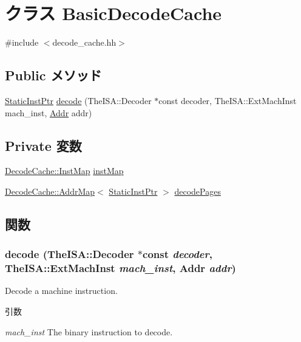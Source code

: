 \hypertarget{classGenericISA_1_1BasicDecodeCache}{
\section{クラス BasicDecodeCache}
\label{classGenericISA_1_1BasicDecodeCache}
}


{\ttfamily \#include $<$decode\_\-cache.hh$>$}\subsection*{Public メソッド}
\begin{DoxyCompactItemize}
\item 
\hyperlink{classRefCountingPtr}{StaticInstPtr} \hyperlink{classGenericISA_1_1BasicDecodeCache_a72ea97ec0370232cc2dfaa755e5ae6f5}{decode} (TheISA::Decoder $\ast$const decoder, TheISA::ExtMachInst mach\_\-inst, \hyperlink{base_2types_8hh_af1bb03d6a4ee096394a6749f0a169232}{Addr} addr)
\end{DoxyCompactItemize}
\subsection*{Private 変数}
\begin{DoxyCompactItemize}
\item 
\hyperlink{namespaceDecodeCache_ac4aa7140c72815d25936c8dcf04191f1}{DecodeCache::InstMap} \hyperlink{classGenericISA_1_1BasicDecodeCache_abd0faa656234a0fd1a69ea9a2d61d154}{instMap}
\item 
\hyperlink{classDecodeCache_1_1AddrMap}{DecodeCache::AddrMap}$<$ \hyperlink{classRefCountingPtr}{StaticInstPtr} $>$ \hyperlink{classGenericISA_1_1BasicDecodeCache_a2a8e058f871a2313b0b5b0e8094dbe40}{decodePages}
\end{DoxyCompactItemize}


\subsection{関数}
\hypertarget{classGenericISA_1_1BasicDecodeCache_a72ea97ec0370232cc2dfaa755e5ae6f5}{
\subsubsection[{decode}]{ decode (TheISA::Decoder $\ast$const {\em decoder}, \/  TheISA::ExtMachInst {\em mach\_\-inst}, \/  {\bf Addr} {\em addr})}}
\label{classGenericISA_1_1BasicDecodeCache_a72ea97ec0370232cc2dfaa755e5ae6f5}
Decode a machine instruction. 
\begin{DoxyParams}{引数}
\item[{\em mach\_\-inst}]The binary instruction to decode. \end{DoxyParams}

